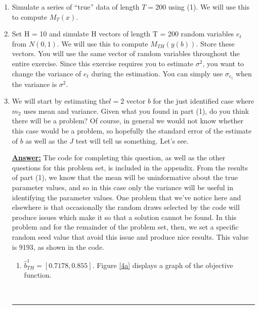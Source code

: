 \documentclass{article} %
\DeclareMathOperator*{\E}{\mathbb{E}} %
\theoremstyle{definition}
\newenvironment{solution}[1][Answer]{\begin{singlespace}\underline{\textbf{#1:}}\quad }{\ \rule{0.3em}{0.3em}\end{singlespace}} %
\begin{document}
\begin{enumerate}
\begin{solution}
			Both the variance and the first order correlation are informative for estimating $ b $. This is because we can estimate the true parameters given the two moments as follows
			\begin{align*}
				\rho_0 = \frac{ \E[(x_t - \E[x_t]) (x_{t-1} - \E[x_{t-1}]) ] }{ 	\E[(x_t - \E[x_t])^2]  } && \sigma^2 =  \E[(x_t - \E[x_t])^2] -  \frac{ \E[(x_t - \E[x_t]) (x_{t-1} - \E[x_{t-1}]) ] }{ 	\E[(x_t - \E[x_t])^2]  }
			\end{align*}
		\end{solution}
		\item Simulate a series of “true” data of length $ T = 200 $ using (1). We will use this to compute
		$ M_T (x) $.
		
		\item Set H = 10 and simulate H vectors of length T = 200 random variables $ e_t $ from $ N(0, 1) $. We will use this to compute $ M_{TH}(y(b)) $. Store these vectors. You will use the same vector of random variables throughout the entire exercise. Since this exercise requires you to estimate $ \sigma^2 $, you want to change the variance of $ e_t $ during the estimation. You can simply use $ \sigma_{e_t} $ when the variance is $ \sigma^2 $.
		\item We will start by estimating the$l = 2$ vector $b$ for the just identified case where $m_{2}$ uses mean and variance. Given what you found in part (1), do you think there will be a problem? Of course, in general we would not know whether this case would be a problem, so hopefully the standard error of the estimate of $b$ as well as the $J$ test will tell us something. Let’s see.
		\begin{solution}
		The code for completing this question, as well as the other questions for this problem set, is included in the appendix. From the results of part (1), we know that the mean will be uninformative about the true parameter values, and so in this case only the variance will be useful in identifying the parameter values. One problem that we've notice here and elsewhere is that occasionally the random draws selected by the code will produce issues which make it so that a solution cannot be found. In this problem and for the remainder of the problem set, then, we set a specific random seed value that avoid this issue and produce nice results. This value is 9193, as shown in the code.
		\begin{enumerate}[label=(\alph*)]
			\item $\hat{b}_{TH}^{1}=[0.7178,0.855]$. Figure \ref{4a} displays a graph of the objective function.

\end{enumerate}
\end{solution}
\end{enumerate}
\end{document}

